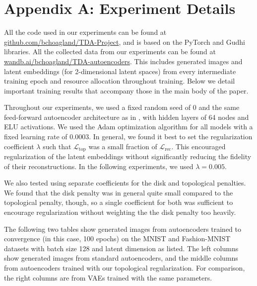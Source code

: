 \documentclass[conference]{IEEEtran}
\begin{document}
\section*{Appendix A: Experiment Details}
\label{experiment-details}

All the code used in our experiments can be found at \href{https://github.com/BCHoagland/TDA-Project}{\color{blue}github.com/bchoagland/TDA-Project}, and is based on the PyTorch and Gudhi libraries. All the collected data from our experiments can be found at \href{https://wandb.ai/bchoagland/TDA-autoencoders}{\color{blue}wandb.ai/bchoagland/TDA-autoencoders}. This includes generated images and latent embeddings (for 2-dimensional latent spaces) from every intermediate training epoch and resource allocation throughout training. Below we detail important training results that accompany those in the main body of the paper.

Throughout our experiments, we used a fixed random seed of 0 and the same feed-forward autoencoder architecture as in , with hidden layers of 64 nodes and ELU activations. We used the Adam optimization algorithm for all models with a fixed learning rate of $0.0003$. In general, we found it best to set the regularization coefficient $\lambda$ such that $\mathcal{L}_{\text{top}}$ was a small fraction of $\mathcal{L}_{\text{rec}}$. This encouraged regularization of the latent embeddings without significantly reducing the fidelity of their reconstructions. In the following experiments, we used $\lambda = 0.005$.

We also tested using separate coefficients for the disk and topological penalties. We found that the disk penalty was in general quite small compared to the topological penalty, though, so a single coefficient for both was sufficient to encourage regularization without weighting the the disk penalty too heavily.

The following two tables show generated images from autoencoders trained to convergence (in this case, 100 epochs) on the MNIST and Fashion-MNIST datasets with batch size 128 and latent dimension as listed. The left columns show generated images from standard autoencoders, and the middle columns from autoencoders trained with our topological regularization. For comparison, the right columns are from VAEs trained with the same parameters.
\end{document}
